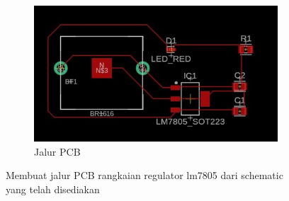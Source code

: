 \begin{enumerate}
\begin{figure}[H]
\begin{subfigure}[b]{0.45\linewidth}
      \centering
      \includegraphics[width=\linewidth]{img/modul_1/pcb_tupen(2).jpg}
      \caption{Jalur PCB\label{fig:inisub2}}
    \end{subfigure}
    \caption{Membuat jalur PCB rangkaian regulator lm7805 dari schematic yang telah disediakan\label{fig:keduagambar}}
  \end{figure}
\end{enumerate}